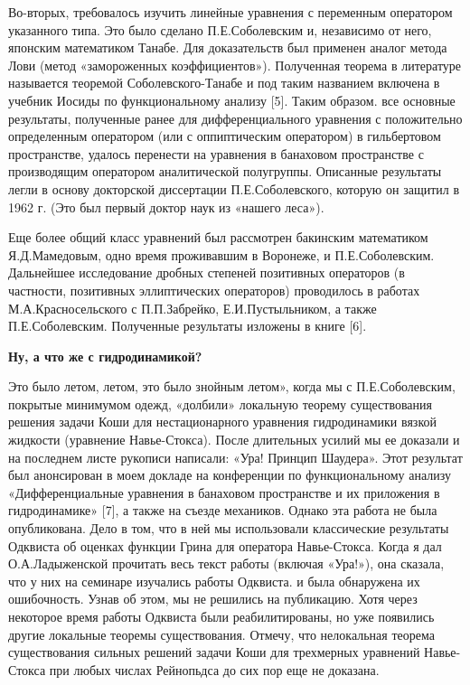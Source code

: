 Во-вторых, требовалось изучить линейные уравнения с переменным оператором указанного типа. Это было сделано П.Е.Соболевским и, независимо от него, японским математиком Танабе. Для доказательств был применен аналог метода Лови (метод «замороженных коэффициентов»). Полученная теорема в литературе называется теоремой Соболевского-Танабе и под таким названием
включена в учебник Иосиды по функциональному анализу [5].
Таким образом. все основные результаты,
полученные ранее для дифференциального уравнения с положительно определенным оператором (или с оппиптическим оператором)
в гильбертовом пространстве,
удалось перенести на уравнения в банаховом пространстве с производящим оператором аналитической полугруппы. Описанные результаты легли в основу докторской диссертации П.Е.Соболевского, которую он защитил в 1962 г. (Это был первый доктор наук из «нашего леса»).

Еще более общий класс уравнений был рассмотрен бакинским математиком Я.Д.Мамедовым, одно время проживавшим в Воронеже, и П.Е.Соболевским. Дальнейшее исследование дробных степеней позитивных операторов (в частности, позитивных эллиптических операторов) проводилось в работах М.А.Красносельского с П.П.Забрейко, Е.И.Пустыльником, а также П.Е.Соболевским. Полученные результаты изложены в книге [6].

{\bf Ну, а что же с гидродинамикой?}

Это было летом, летом, это было знойным летом», когда мы с П.Е.Соболевским, покрытые минимумом одежд, «долбили» локальную теорему существования решения задачи Коши для нестационарного уравнения гидродинамики вязкой жидкости (уравнение Навье-Стокса). После длительных усилий мы ее доказали и на последнем листе рукописи написали: «Ура! Принцип Шаудера». Этот результат был анонсирован в моем докладе на конференции по функциональному анализу «Дифференциальные уравнения в банаховом пространстве и их приложения в гидродинамике» [7], а также на съезде механиков. Однако эта работа не была опубликована. Дело в том, что в ней мы использовали классические результаты Одквиста об оценках функции Грина для оператора Навье-Стокса. Когда я дал О.А.Ладыженской прочитать весь текст работы (включая «Ура!»), она сказала, что у них на семинаре изучались работы Одквиста. и была обнаружена их ошибочность. Узнав об этом, мы не решились на публикацию. Хотя через некоторое время работы Одквиста были реабилитированы, но уже появились другие локальные теоремы существования. Отмечу, что нелокальная теорема существования сильных решений задачи Коши для трехмерных уравнений Навье-Стокса при любых числах Рейнопьдса до сих пор еще не доказана.

